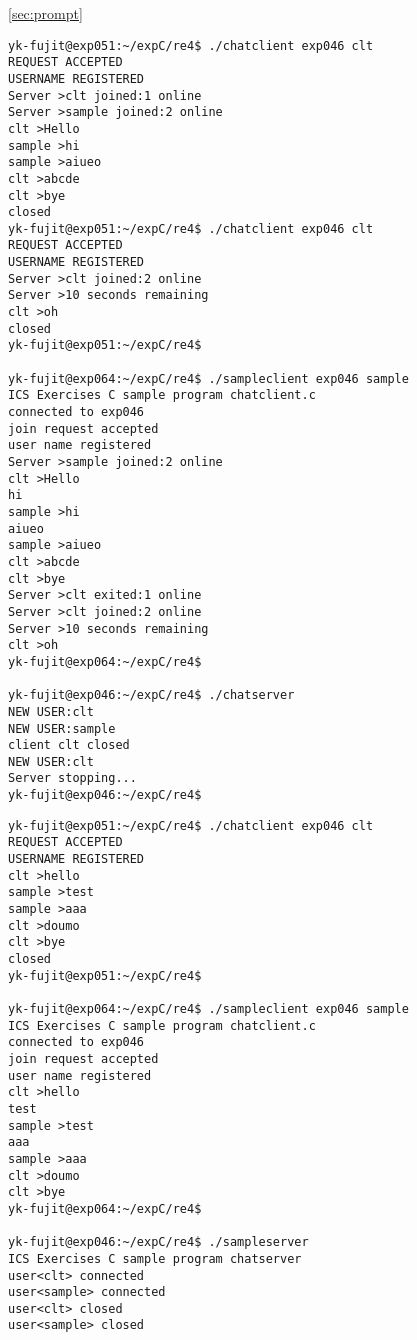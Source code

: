 \documentclass[a4j,10pt,titlepage]{jsarticle}
\begin{document}
\ref{sec:prompt}

\begin{verbatim}
yk-fujit@exp051:~/expC/re4$ ./chatclient exp046 clt
REQUEST ACCEPTED
USERNAME REGISTERED
Server >clt joined:1 online
Server >sample joined:2 online
clt >Hello
sample >hi
sample >aiueo
clt >abcde
clt >bye
closed
yk-fujit@exp051:~/expC/re4$ ./chatclient exp046 clt
REQUEST ACCEPTED
USERNAME REGISTERED
Server >clt joined:2 online
Server >10 seconds remaining
clt >oh
closed
yk-fujit@exp051:~/expC/re4$ 

yk-fujit@exp064:~/expC/re4$ ./sampleclient exp046 sample
ICS Exercises C sample program chatclient.c
connected to exp046
join request accepted
user name registered
Server >sample joined:2 online
clt >Hello
hi
sample >hi
aiueo
sample >aiueo
clt >abcde
clt >bye
Server >clt exited:1 online
Server >clt joined:2 online
Server >10 seconds remaining
clt >oh
yk-fujit@exp064:~/expC/re4$ 

yk-fujit@exp046:~/expC/re4$ ./chatserver 
NEW USER:clt
NEW USER:sample
client clt closed
NEW USER:clt
Server stopping...
yk-fujit@exp046:~/expC/re4$ 
\end{verbatim}

\begin{verbatim}
yk-fujit@exp051:~/expC/re4$ ./chatclient exp046 clt
REQUEST ACCEPTED
USERNAME REGISTERED
clt >hello
sample >test
sample >aaa
clt >doumo
clt >bye
closed
yk-fujit@exp051:~/expC/re4$ 

yk-fujit@exp064:~/expC/re4$ ./sampleclient exp046 sample
ICS Exercises C sample program chatclient.c
connected to exp046
join request accepted
user name registered
clt >hello
test
sample >test
aaa
sample >aaa
clt >doumo
clt >bye
yk-fujit@exp064:~/expC/re4$

yk-fujit@exp046:~/expC/re4$ ./sampleserver 
ICS Exercises C sample program chatserver
user<clt> connected
user<sample> connected
user<clt> closed
user<sample> closed
\end{verbatim}
\end{document}
